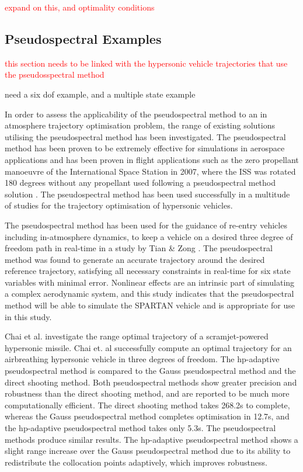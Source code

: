 \textcolor{red}{expand on this, and optimality conditions}

\subsection{Pseudospectral Examples}
\textcolor{red}{this section needs to be linked with the hypersonic vehicle trajectories that use the pseudosspectral method}

need a six dof example, and a multiple state example

In order to assess the applicability of the pseudospectral method to an in atmosphere trajectory optimisation problem, the range of existing solutions utilising the pseudospectral method has been investigated. 
The pseudospectral method has been proven to be extremely effective for simulations in aerospace applications and has been proven in flight applications such as the zero propellant manoeuvre of the International Space Station in 2007, where the ISS was rotated 180 degrees without any propellant used following a pseudospectral method solution \cite{Bedrossian}. 
The pseudospectral method has been used successfully in a multitude of studies for the trajectory optimisation of hypersonic vehicles\cite{Li2012,Josselyn2002a,Zhao2013,Tian2011,Darby2011,Chai2015,Rizvi2015,Moshman2014}. 

 The pseudospectral method has been used for the guidance of re-entry vehicles including in-atmosphere dynamics, to keep a vehicle on a desired three degree of freedom path in real-time in a study by Tian \& Zong \cite{Tian2011}. The pseudospectral method was found to generate an accurate trajectory around the desired reference trajectory, satisfying all necessary constraints in real-time for six state variables with minimal error.  Nonlinear effects are an intrinsic part of simulating a complex aerodynamic system, and this study indicates that the pseudospectral method will be able to simulate the SPARTAN vehicle and is appropriate for use in this study.
 
 Chai et al.\cite{Chai2015} investigate the range optimal trajectory of a scramjet-powered hypersonic missile. Chai et. al successfully compute an optimal trajectory for an airbreathing hypersonic vehicle in three degrees of freedom\cite{Chai2015}.  The hp-adaptive pseudospectral method is compared to the Gauss pseudospectral method and the direct shooting method. Both pseudospectral methods show greater precision and robustness than the direct shooting method, and are reported to be much more computationally efficient. The direct shooting method takes 268.2s to complete,
  whereas the Gauss pseudospectral method completes optimisation in 12.7s, and the hp-adaptive pseudospectral method takes only 5.3s\cite{Chai2015}. 
  The pseudospectral methods produce similar results. The hp-adaptive pseudospectral method shows a slight range increase over the Gauss pseudospectral method due to its ability to redistribute the collocation points adaptively, which improves robustness. 
 
